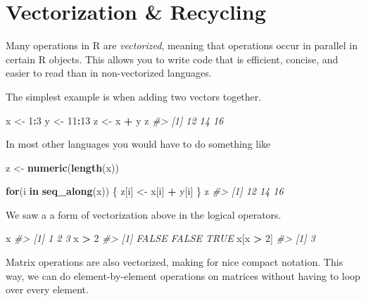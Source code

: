 \documentclass[]{book}
\newenvironment{Shaded}{\begin{snugshade}}{\end{snugshade}}
\newcommand{\KeywordTok}[1]{\textcolor[rgb]{0.13,0.29,0.53}{\textbf{#1}}}
\newcommand{\DecValTok}[1]{\textcolor[rgb]{0.00,0.00,0.81}{#1}}
\newcommand{\StringTok}[1]{\textcolor[rgb]{0.31,0.60,0.02}{#1}}
\newcommand{\CommentTok}[1]{\textcolor[rgb]{0.56,0.35,0.01}{\textit{#1}}}
\newcommand{\ControlFlowTok}[1]{\textcolor[rgb]{0.13,0.29,0.53}{\textbf{#1}}}
\newcommand{\OperatorTok}[1]{\textcolor[rgb]{0.81,0.36,0.00}{\textbf{#1}}}
\newcommand{\NormalTok}[1]{#1}
\theoremstyle{definition}
\theoremstyle{definition}
\theoremstyle{definition}
\theoremstyle{remark}
\begin{document}
\section{Vectorization \& Recycling}\label{vectorization-recycling}

Many operations in R are \emph{vectorized}, meaning that operations
occur in parallel in certain R objects. This allows you to write code
that is efficient, concise, and easier to read than in non-vectorized
languages.

The simplest example is when adding two vectors together.

\begin{Shaded}
\begin{Highlighting}[]
\NormalTok{x <-}\StringTok{ }\DecValTok{1}\OperatorTok{:}\DecValTok{3}
\NormalTok{y <-}\StringTok{ }\DecValTok{11}\OperatorTok{:}\DecValTok{13}
\NormalTok{z <-}\StringTok{ }\NormalTok{x }\OperatorTok{+}\StringTok{ }\NormalTok{y}
\NormalTok{z}
\CommentTok{#> [1] 12 14 16}
\end{Highlighting}
\end{Shaded}

In most other languages you would have to do something like

\begin{Shaded}
\begin{Highlighting}[]
\NormalTok{z <-}\StringTok{ }\KeywordTok{numeric}\NormalTok{(}\KeywordTok{length}\NormalTok{(x))}

\ControlFlowTok{for}\NormalTok{(i }\ControlFlowTok{in} \KeywordTok{seq_along}\NormalTok{(x)) \{}
\NormalTok{      z[i] <-}\StringTok{ }\NormalTok{x[i] }\OperatorTok{+}\StringTok{ }\NormalTok{y[i]}
\NormalTok{\}}
\NormalTok{z}
\CommentTok{#> [1] 12 14 16}
\end{Highlighting}
\end{Shaded}

We saw a a form of vectorization above in the logical operators.

\begin{Shaded}
\begin{Highlighting}[]
\NormalTok{x}
\CommentTok{#> [1] 1 2 3}
\NormalTok{x }\OperatorTok{>}\StringTok{ }\DecValTok{2}
\CommentTok{#> [1] FALSE FALSE  TRUE}
\NormalTok{x[x }\OperatorTok{>}\StringTok{ }\DecValTok{2}\NormalTok{]}
\CommentTok{#> [1] 3}
\end{Highlighting}
\end{Shaded}

Matrix operations are also vectorized, making for nice compact notation.
This way, we can do element-by-element operations on matrices without
having to loop over every element.
\end{document}
